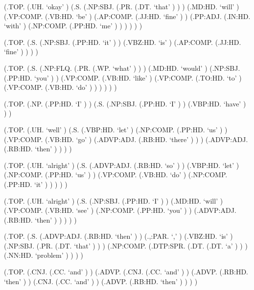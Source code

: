 \documentclass[10pt]{article}
\begin{document}
\begin{parsetree}  (.TOP. (.UH. `okay' ) (.S. (.NP:SBJ. (.PR. (.DT. `that' ) ) ) (.MD:HD. `will' ) (.VP:COMP. (.VB:HD. `be' ) (.AP:COMP. (.JJ:HD. `fine' ) ) (.PP:ADJ. (.IN:HD. `with' ) (.NP:COMP. (.PP:HD. `me' ) ) ) ) ) ) \end{parsetree}

\begin{parsetree}  (.TOP. (.S. (.NP:SBJ. (.PP:HD. `it' ) ) (.VBZ:HD. `is' ) (.AP:COMP. (.JJ:HD. `fine' ) ) ) ) \end{parsetree}

\begin{parsetree}  (.TOP. (.S. (.NP:FLQ. (.PR. (.WP. `what' ) ) ) (.MD:HD. `would' ) (.NP:SBJ. (.PP:HD. `you' ) ) (.VP:COMP. (.VB:HD. `like' ) (.VP:COMP. (.TO:HD. `to' ) (.VP:COMP. (.VB:HD. `do' ) ) ) ) ) ) \end{parsetree}

\begin{parsetree}  (.TOP. (.NP. (.PP:HD. `I' ) ) (.S. (.NP:SBJ. (.PP:HD. `I' ) ) (.VBP:HD. `have' ) ) ) \end{parsetree}

\begin{parsetree}  (.TOP. (.UH. `well' ) (.S. (.VBP:HD. `let' ) (.NP:COMP. (.PP:HD. `us' ) ) (.VP:COMP. (.VB:HD. `go' ) (.ADVP:ADJ. (.RB:HD. `there' ) ) ) (.ADVP:ADJ. (.RB:HD. `then' ) ) ) ) \end{parsetree}

\begin{parsetree}  (.TOP. (.UH. `alright' ) (.S. (.ADVP:ADJ. (.RB:HD. `so' ) ) (.VBP:HD. `let' ) (.NP:COMP. (.PP:HD. `us' ) ) (.VP:COMP. (.VB:HD. `do' ) (.NP:COMP. (.PP:HD. `it' ) ) ) ) ) \end{parsetree}

\begin{parsetree}  (.TOP. (.UH. `alright' ) (.S. (.NP:SBJ. (.PP:HD. `I' ) ) (.MD:HD. `will' ) (.VP:COMP. (.VB:HD. `see' ) (.NP:COMP. (.PP:HD. `you' ) ) (.ADVP:ADJ. (.RB:HD. `then' ) ) ) ) ) \end{parsetree}

\begin{parsetree}  (.TOP. (.S. (.ADVP:ADJ. (.RB:HD. `then' ) ) (.,:PAR. `,' ) (.VBZ:HD. `is' ) (.NP:SBJ. (.PR. (.DT. `that' ) ) ) (.NP:COMP. (.DTP:SPR. (.DT. (.DT. `a' ) ) ) (.NN:HD. `problem' ) ) ) ) \end{parsetree}

\begin{parsetree}  (.TOP. (.CNJ. (.CC. `and' ) ) (.ADVP. (.CNJ. (.CC. `and' ) ) (.ADVP. (.RB:HD. `then' ) ) (.CNJ. (.CC. `and' ) ) (.ADVP. (.RB:HD. `then' ) ) ) ) \end{parsetree}
\end{document}
